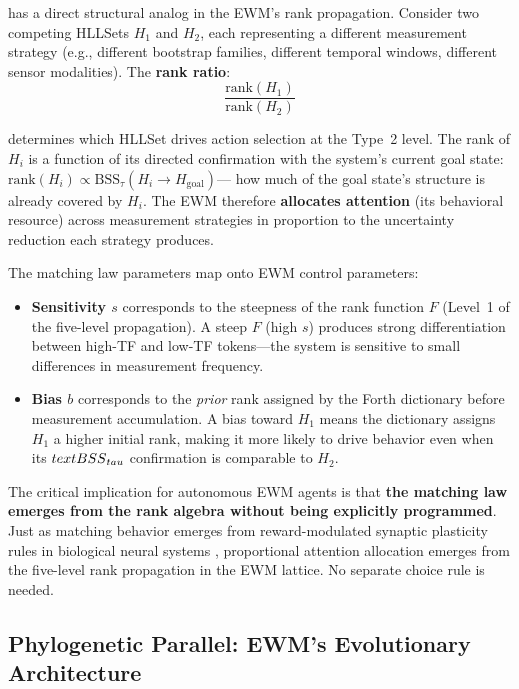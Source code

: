 \documentclass[11pt,a4paper]{article}
\theoremstyle{remark}
\begin{document}
has a direct structural analog in the EWM's rank propagation. Consider two
competing HLLSets $H_1$ and $H_2$, each representing a different measurement
strategy (e.g., different bootstrap families, different temporal windows,
different sensor modalities). The \textbf{rank ratio}:
\begin{equation}
  \frac{\text{rank}(H_1)}{\text{rank}(H_2)}
\end{equation}

determines which HLLSet drives action selection at the Type~2 level. The rank of
$H_i$ is a function of its directed confirmation with the system's current goal
state: $\text{rank}(H_i) \propto \text{BSS}_{\tau}(H_i \to H_{\text{goal}})$---
how much of the goal state's structure is already covered by $H_i$. The EWM
therefore \textbf{allocates attention} (its behavioral resource) across
measurement strategies in proportion to the uncertainty reduction each strategy
produces.

The matching law parameters map onto EWM control parameters:
\begin{itemize}[leftmargin=*,nosep]
  \item \textbf{Sensitivity $s$} corresponds to the steepness of the rank
    function $F$ (Level~1 of the five-level propagation). A steep $F$ (high $s$)
    produces strong differentiation between high-TF and low-TF tokens---the
    system is sensitive to small differences in measurement frequency.
  \item \textbf{Bias $b$} corresponds to the \textit{prior} rank assigned by
    the Forth dictionary before measurement accumulation. A bias toward $H_1$
    means the dictionary assigns $H_1$ a higher initial rank, making it more
    likely to drive behavior even when its $\\text{BSS}_{\\tau}$ confirmation is comparable to
    $H_2$.
\end{itemize}

The critical implication for autonomous EWM agents is that \textbf{the matching
law emerges from the rank algebra without being explicitly programmed}. Just as
matching behavior emerges from reward-modulated synaptic plasticity rules in
biological neural systems \cite{lincoln2026}, proportional attention allocation
emerges from the five-level rank propagation in the EWM lattice. No separate
choice rule is needed.

\subsection{Phylogenetic Parallel: EWM's Evolutionary Architecture}
\label{sec:phylogenetic}
\end{document}
